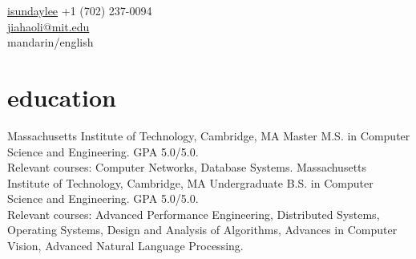 \documentclass[__VERSION__]{friggeri-cv} %
\begin{document}
{\faGithub \hspace{0.1em} \href{https://github.com/isundaylee}{isundaylee}}
{+1 (702) 237-0094\\
\href{mailto:jiahaoli@mit.edu}{jiahaoli@mit.edu}\\
mandarin/english} %




\section{education}

\begin{entrylist}
  {Massachusetts Institute of Technology, Cambridge, MA}
  {Master}
  {M.S. in Computer Science and Engineering. GPA 5.0/5.0.\\
  Relevant courses: Computer Networks, Database Systems.}
  {Massachusetts Institute of Technology, Cambridge, MA}
  {Undergraduate}
  {B.S. in Computer Science and Engineering. GPA 5.0/5.0. \\
  Relevant courses: Advanced Performance Engineering, Distributed Systems, Operating Systems, Design and Analysis of Algorithms, Advances in Computer Vision, Advanced Natural Language Processing.}
\end{entrylist}
\end{document}

